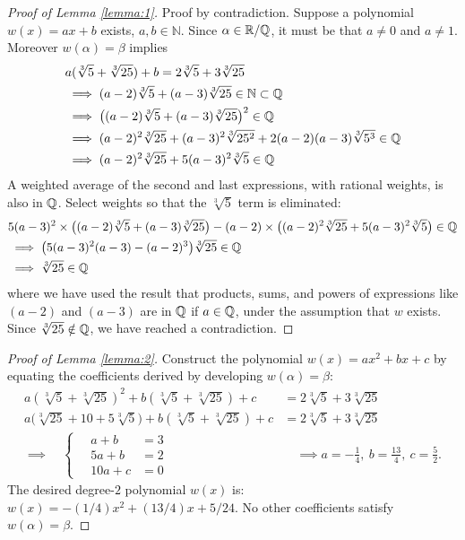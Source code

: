 \begin{proof}[Proof of Lemma \ref{lemma:1}]
Proof by contradiction. Suppose a polynomial $w(x)=ax+b$ exists, $a,b\in\mathbb{N}$. Since $\alpha\in\mathbb{R}/\mathbb{Q}$, it must be that $a\ne0$ and $a\ne1$. Moreover $w(\alpha)=\beta$ implies
\begin{align*}
&
a (\sqrt[3]{5}+\sqrt[3]{25}) + b
= 2\sqrt[3]{5}+3\sqrt[3]{25}
\\
& \implies
(a-2)\sqrt[3]{5} + (a-3)\sqrt[3]{25} 
\in \mathbb{N} \subset \mathbb{Q}
\\
& \implies
\bigl((a-2)\sqrt[3]{5} + (a-3)\sqrt[3]{25}\bigr)^{2}
\in \mathbb{Q}
\\
& \implies
(a-2)^{2}\sqrt[3]{25} + (a-3)^{2}\sqrt[3]{25^{2}} + 2(a-2)(a-3)\sqrt[3]{5^{3}} 
\in \mathbb{Q}
\\
& \implies
(a-2)^{2}\sqrt[3]{25} + 5(a-3)^{2}\sqrt[3]{5} 
\in \mathbb{Q}
\end{align*}
A weighted average of the second and last expressions, with rational weights, is also in $\mathbb{Q}$. Select weights so that the $\sqrt[3]{5}$ term is eliminated:
\begin{align*}
&
5(a-3)^{2} \times 
\bigl((a-2)\sqrt[3]{5} + (a-3)\sqrt[3]{25}\bigr)
-
(a-2) \times
\bigl((a-2)^{2}\sqrt[3]{25} + 5(a-3)^{2}\sqrt[3]{5}\bigr)
\in \mathbb{Q}
\\
& \implies
\bigl(5(a-3)^{2}(a-3) - (a-2)^{3}\bigr)\sqrt[3]{25}
\in \mathbb{Q}
\\
& \implies
\sqrt[3]{25}
\in \mathbb{Q}
\end{align*}
where we have used the result that products, sums, and powers of expressions like $(a-2)$ and $(a-3)$ are in $\mathbb{Q}$ if $a\in\mathbb{Q}$, under the assumption that $w$ exists. Since $\sqrt[3]{25}\notin\mathbb{Q}$, we have reached a contradiction.
\end{proof}

\begin{proof}[Proof of Lemma \ref{lemma:2}]
Construct the polynomial $w(x)=ax^{2}+bx+c$ by equating the coefficients derived by developing $w(\alpha)=\beta$:
\begin{align*}
a (\sqrt[3]{5}+\sqrt[3]{25})^{2} + b (\sqrt[3]{5}+\sqrt[3]{25}) + c
& = 2\sqrt[3]{5} + 3\sqrt[3]{25}
\\[1ex]
a \bigl(\sqrt[3]{25} + 10 + 5\sqrt[3]{5}\bigr)
+ b (\sqrt[3]{5}+\sqrt[3]{25}) + c
& = 2\sqrt[3]{5} + 3\sqrt[3]{25}
\\
\implies \quad
{\scriptscriptstyle
\begin{cases}
\quad
a + b
& = 3
\\\quad
5a + b
& = 2
\\\quad
10a + c
& = 0
\end{cases}}
& \quad \implies 
a = -\frac{1}{4}, \
b = \frac{13}{4}, \
c = \frac{5}{2}.
\end{align*}
The desired degree-$2$ polynomial $w(x)$ is: $w(x)=-(1/4)x^{2}+(13/4)x+5/24$. No other coefficients satisfy $w(\alpha)=\beta$.
\end{proof}

